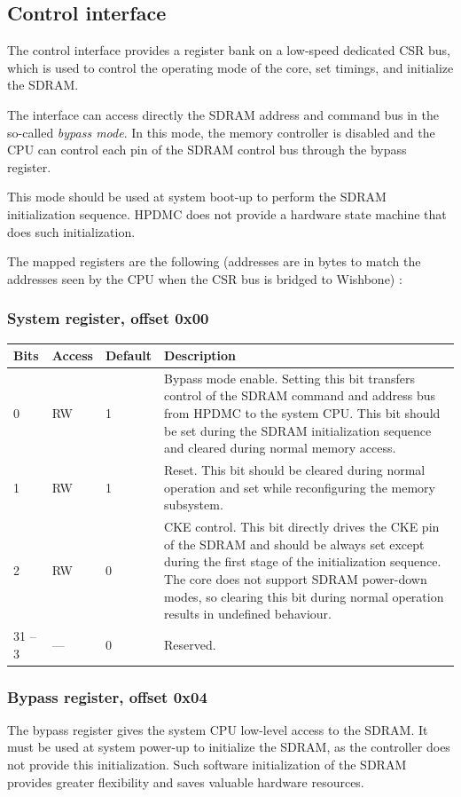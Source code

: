 \documentclass[a4paper,11pt]{article}
\begin{document}
\subsection{Control interface}
The control interface provides a register bank on a low-speed dedicated CSR bus, which is used to control the operating mode of the core, set timings, and initialize the SDRAM.

The interface can access directly the SDRAM address and command bus in the so-called \textit{bypass mode}. In this mode, the memory controller is disabled and the CPU can control each pin of the SDRAM control bus through the bypass register.

This mode should be used at system boot-up to perform the SDRAM initialization sequence. HPDMC does not provide a hardware state machine that does such initialization.

The mapped registers are the following (addresses are in bytes to match the addresses seen by the CPU when the CSR bus is bridged to Wishbone) :

\subsubsection{System register, offset 0x00}
\begin{tabularx}{\textwidth}{|l|l|l|X|}
\hline
\bf Bits & \bf Access & \bf Default & \bf Description \\
\hline
0 & RW & 1 & Bypass mode enable. Setting this bit transfers control of the SDRAM command and address bus from HPDMC to the system CPU. This bit should be set during the SDRAM initialization sequence and cleared during normal memory access. \\
\hline
1 & RW & 1 & Reset. This bit should be cleared during normal operation and set while reconfiguring the memory subsystem. \\
\hline
2 & RW & 0 & CKE control. This bit directly drives the CKE pin of the SDRAM and should be always set except during the first stage of the initialization sequence. The core does not support SDRAM power-down modes, so clearing this bit during normal operation results in undefined behaviour. \\
\hline
31 -- 3 & --- & 0 & Reserved. \\
\hline
\end{tabularx}

\subsubsection{Bypass register, offset 0x04}
The bypass register gives the system CPU low-level access to the SDRAM. It must be used at system power-up to initialize the SDRAM, as the controller does not provide this initialization. Such software initialization of the SDRAM provides greater flexibility and saves valuable hardware resources.
\end{document}

